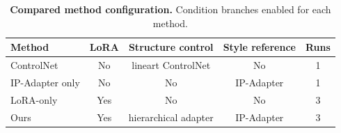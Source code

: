 \begin{table}[t]
\centering
\small
\caption{\textbf{Compared method configuration.} Condition branches enabled for each method.}
\label{tab:method-configuration}
\begin{tabular}{lcccc}
\toprule
\textbf{Method} & \textbf{LoRA} & \textbf{Structure control} & \textbf{Style reference} & \textbf{Runs} \\
\midrule
ControlNet & No & lineart ControlNet & No & 1 \\
IP-Adapter only & No & No & IP-Adapter & 1 \\
LoRA-only & Yes & No & No & 3 \\
Ours & Yes & hierarchical adapter & IP-Adapter & 3 \\
\bottomrule
\end{tabular}
\end{table}
